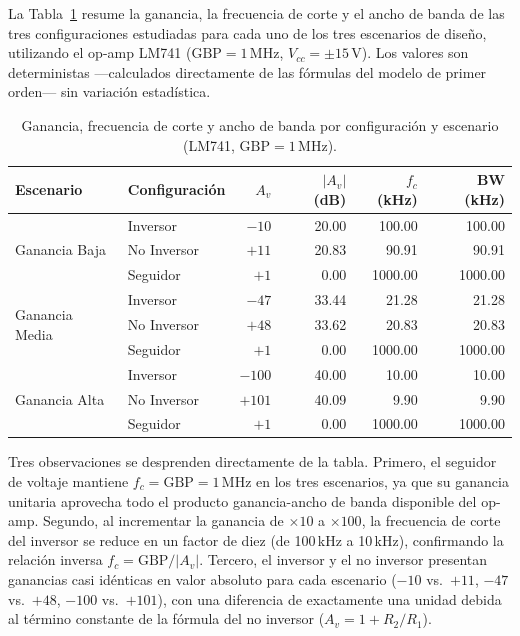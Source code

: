 ﻿\documentclass[12pt, letterpaper]{article}
\begin{document}
La Tabla~\ref{tab:resultados_det} resume la ganancia, la frecuencia de corte y
el ancho de banda de las tres configuraciones estudiadas para cada uno de los
tres escenarios de diseño, utilizando el op-amp LM741
(\(\mathrm{GBP} = 1\,\text{MHz}\), \(V_{cc} = \pm 15\,\text{V}\)).
Los valores son deterministas —calculados directamente de las fórmulas del
modelo de primer orden— sin variación estadística.

\begin{table}[h]
    \centering
    \caption{Ganancia, frecuencia de corte y ancho de banda por configuración
             y escenario (LM741, \(\mathrm{GBP} = 1\,\text{MHz}\)).}
    \label{tab:resultados_det}
    \begin{tabular}{llrrrr}
        \toprule
        \textbf{Escenario} & \textbf{Configuración}
            & \boldmath$A_v$
            & \boldmath$|A_v|$ \textbf{(dB)}
            & \boldmath$f_c$ \textbf{(kHz)}
            & \textbf{BW (kHz)} \\
        \midrule
        \multirow{3}{*}{Ganancia Baja}
            & Inversor      & $-10$  & 20.00 & 100.00  & 100.00  \\
            & No Inversor   & $+11$  & 20.83 &  90.91  &  90.91  \\
            & Seguidor      & $+1$   &  0.00 & 1000.00 & 1000.00 \\
        \midrule
        \multirow{3}{*}{Ganancia Media}
            & Inversor      & $-47$  & 33.44 &  21.28  &  21.28  \\
            & No Inversor   & $+48$  & 33.62 &  20.83  &  20.83  \\
            & Seguidor      & $+1$   &  0.00 & 1000.00 & 1000.00 \\
        \midrule
        \multirow{3}{*}{Ganancia Alta}
            & Inversor      & $-100$ & 40.00 &  10.00  &  10.00  \\
            & No Inversor   & $+101$ & 40.09 &   9.90  &   9.90  \\
            & Seguidor      & $+1$   &  0.00 & 1000.00 & 1000.00 \\
        \bottomrule
    \end{tabular}
\end{table}

Tres observaciones se desprenden directamente de la tabla.
Primero, el seguidor de voltaje mantiene \(f_c = \mathrm{GBP} = 1\,\text{MHz}\)
en los tres escenarios, ya que su ganancia unitaria aprovecha todo el producto
ganancia-ancho de banda disponible del op-amp.
Segundo, al incrementar la ganancia de \(\times 10\) a \(\times 100\),
la frecuencia de corte del inversor se reduce en un factor de diez
(de 100\,kHz a 10\,kHz), confirmando la relación inversa
\(f_c = \mathrm{GBP}/|A_v|\).
Tercero, el inversor y el no inversor presentan ganancias casi idénticas en
valor absoluto para cada escenario (\(-10\) vs.\ \(+11\), \(-47\) vs.\ \(+48\),
\(-100\) vs.\ \(+101\)), con una diferencia de exactamente una unidad debida
al término constante de la fórmula del no inversor
(\(A_v = 1 + R_2/R_1\)).
\end{document}
